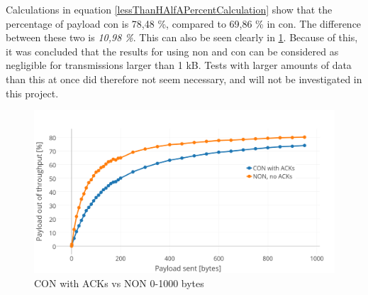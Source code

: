 \noindent Calculations in equation \ref{lessThanHAlfAPercentCalculation} show that the percentage of \gls{payload} \gls{con} is 78,48 \%, compared to 69,86 \% in \gls{con}. The difference between these two is \textit{10,98 \%}. This can also be seen clearly in \ref{fig:NON0-kb2}. Because of this, it was concluded that the results for using \gls{non} and \gls{con} can be considered as negligible for transmissions larger than 1 kB. Tests with larger amounts of data than this at once did therefore not seem necessary, and will not be investigated in this project. 



\begin{figure}[ht]
    \centering
    \includegraphics[width=1.0\textwidth]{CONNON0-kwithACK.png}    
    \caption{CON with ACKs vs NON 0-1000 bytes}
    \label{fig:NON0-kb2}
\end{figure}


